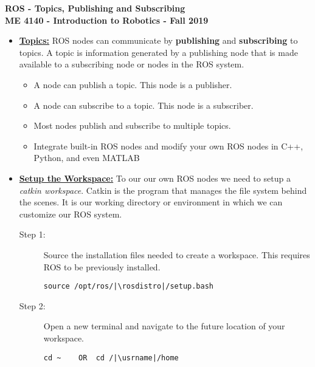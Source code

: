 \documentclass[12pt]{article}
\newcommand{\B}{\color{blue}}
\newcommand{\K}{\color{black}}
\newcommand{\usrname}{\B<user\_name>\K}
\newcommand{\rosdistro}{melodic}
\begin{document}
\thispagestyle{plain}

\begin{center}
   {\bf \Large ROS - Topics, Publishing and Subscribing}\vspace{2mm} \\
   {\bf \large ME 4140 - Introduction to Robotics - Fall 2019} \vspace{5mm}\\
\end{center}

\begin{itemize}
    \item  \href{http://wiki.ros.org/Topics}{\bf Topics:} ROS nodes can communicate by {\bf publishing} and {\bf subscribing} to topics. A topic is information generated by a publishing node that is made available to a subscribing node or nodes in the ROS system.
        
        \begin{itemize}		
            \item A node can publish a topic. This node is a publisher.    	
            \item A node can subscribe to a topic. This node is a subscriber.
            \item Most nodes publish and subscribe to multiple topics. 
            \item Integrate built-in ROS nodes and modify your own ROS nodes in C++, Python, and even MATLAB
            
        \end{itemize}

	\item \href{http://wiki.ros.org/catkin/Tutorials/create_a_workspace}{\bf Setup the Workspace:} To our our own ROS nodes we need to setup a {\it catkin workspace}. Catkin is the program that manages the file system behind the scenes. It is our working directory or environment in which we can customize our ROS system.

	\begin{description}

		\item[Step 1:] Source the installation files needed to create a workspace. This requires ROS to be previously installed.
\begin{verbatim}
source /opt/ros/|\rosdistro|/setup.bash
\end{verbatim}

\item[Step 2:] Open a new terminal and navigate to the future location of your workspace.
\begin{verbatim}
cd ~	OR	cd /|\usrname|/home
\end{verbatim}


\end{description}
\end{itemize}
\end{document}
